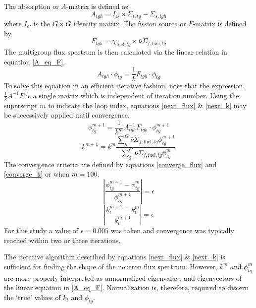 The absorption or $A$-matrix is defined as 
\begin{equation}
\label{A_matrix}
A_{tgh} = I_G \times \Sigma_{t,tg} - \Sigma_{s,tgh}
\end{equation}
where $I_G$ is the $G \times G$ identity matrix. The fission source or $F$-matrix is defined by
\begin{equation}
\label{F_matrix}
F_{tgh} = \chi_{\mbox{fuel},tg} \times \bar{\nu} \Sigma_{f,\mbox{fuel},tg}
\end{equation}
The multigroup flux spectrum is then calculated via the linear relation in equation \ref{A_eq_F}.
\begin{equation}
\label{A_eq_F}
A_{tgh} \cdot \phi_{tg} = \frac{1}{k} F_{tgh} \cdot \phi_{tg}
\end{equation}
To solve this equation in an efficient iterative fashion, note that the expression 
$\frac{1}{k}A^{-1}F$ is a single matrix which is independent of iteration number.  
Using the superscript $m$ to indicate the loop
index, equations \ref{next_flux} \& \ref{next_k} may be successively applied 
until convergence.
\begin{equation}
\label{next_flux}
\phi_{tg}^{m+1} = \frac{1}{k^m} A_{tgh}^{-1} F_{tgh} \cdot \phi_{tg}^{m+1}
\end{equation}
\begin{equation}
\label{next_k}
k^{m+1} = k^m  \frac{\sum_g^G \bar{\nu} \Sigma_{f,\mbox{fuel},tg} \phi_{tg}^{m+1}}
                         {\sum_g^G \bar{\nu} \Sigma_{f,\mbox{fuel},tg} \phi_{tg}^m}
\end{equation}
The convergence criteria are defined by equations \ref{converge_flux} and \ref{converge_k}
or when $m=100$.
\begin{equation}
\label{converge_flux}
\left|\frac{\phi_{tg}^{m+1} - \phi_{tg}^m}{\phi_{tg}^{m+1}}\right| = \epsilon
\end{equation}
\begin{equation}
\label{converge_k}
\left|\frac{k_t^{m+1} - k_t^m}{k_t^{m+1}}\right| = \epsilon
\end{equation}
For this study a value of $\epsilon=0.005$ was taken and convergence was typically 
reached within two or three iterations.

The iterative algorithm described by equations \ref{next_flux} \& \ref{next_k} is 
sufficient for finding the shape of the neutron flux spectrum.  However, $k^m$ and 
$\phi_{tg}^m$ are more properly interpreted as unnormalized eigenvalues and eigenvectors
of the linear equation in \ref{A_eq_F}.  Normalization is, therefore, required to 
discern the `true' values of  $k_t$ and $\phi_{tg}$.

